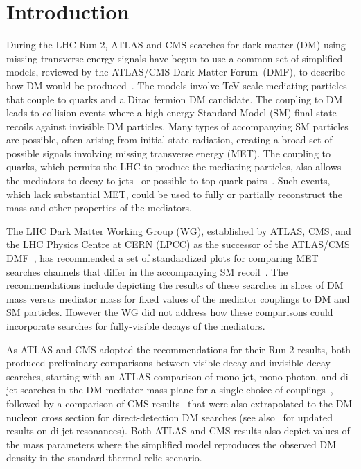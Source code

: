\section{Introduction} 
\label{Intro}

During the LHC Run-2, ATLAS and CMS searches for dark matter (DM) using missing transverse energy signals %
have begun to use a common set of simplified models, 
reviewed by the ATLAS/CMS Dark Matter Forum~(DMF), 
to describe how DM would be produced~\cite{Abercrombie:2015wmb}. The models involve TeV-scale mediating particles that couple to quarks and a Dirac fermion DM candidate. The coupling to DM leads to collision events where a high-energy Standard Model (SM) final state recoils against invisible DM particles. Many types of accompanying SM particles are possible, often arising from initial-state radiation, creating a broad set of possible signals involving missing transverse energy (MET). The coupling to quarks, which permits the LHC to produce the mediating particles, also allows the mediators to decay to jets~\cite{Dreiner:2013vla,Chala:2015ama,Fairbairn:2016iuf} or possible to top-quark pairs~\cite{Chala:2015ama,ATLAS:2016pyq,Bauer:2017ota}. Such events, which lack substantial MET, could be used to fully or partially reconstruct the mass and other properties of the mediators.

The LHC Dark Matter Working Group (WG), established by ATLAS, CMS, and the LHC Physics Centre at CERN (LPCC) as the successor of the ATLAS/CMS %
DMF~\cite{Abercrombie:2015wmb}, has recommended a set of standardized plots for comparing MET searches channels that differ in the accompanying SM recoil~\cite{Boveia:2016mrp}. The recommendations include depicting the results of these searches in slices of DM mass versus mediator mass for fixed values of the mediator couplings to DM and SM particles. However %
the WG 
did not address how these comparisons could incorporate searches for fully-visible decays of the mediators.

As ATLAS and CMS adopted the recommendations for their Run-2 results, both produced preliminary comparisons between visible-decay and invisible-decay searches, starting %
with an ATLAS comparison of mono-jet, mono-photon, and di-jet searches in the DM-mediator mass plane for a single choice of couplings~\cite{ATLASsummaryplots}, followed by a  comparison of CMS results~\cite{CMS_SummaryPlots_ICHEP} that were also extrapolated to the DM-nucleon cross section for direct-detection DM searches (see also~\cite{Sirunyan:2016iap} for updated results on di-jet resonances). Both ATLAS and CMS results also depict values of the mass parameters where the simplified model reproduces the observed DM density in the standard thermal relic scenario.

